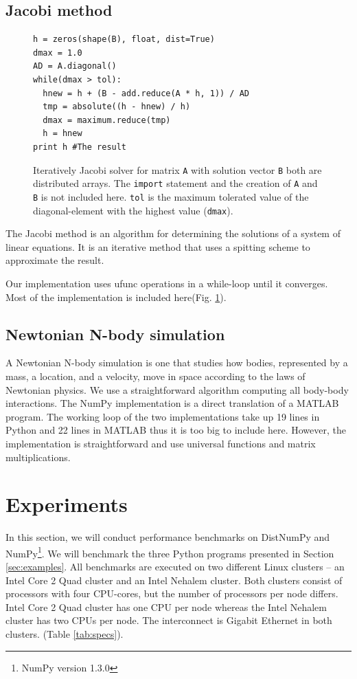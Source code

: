 \documentclass{sigplanconf}
\begin{document}
\subsection{Jacobi method}
\begin{figure}
\begin{lstlisting}
h = zeros(shape(B), float, dist=True)
dmax = 1.0
AD = A.diagonal()
while(dmax > tol):
  hnew = h + (B - add.reduce(A * h, 1)) / AD
  tmp = absolute((h - hnew) / h)
  dmax = maximum.reduce(tmp)
  h = hnew
print h #The result
\end{lstlisting}
 \caption{Iteratively Jacobi solver for matrix \texttt{A} with solution vector \texttt{B} both are distributed arrays. The \texttt{import} statement and the creation of \texttt{A} and \texttt{B} is not included here.
 \texttt{tol} is the maximum tolerated value of the diagonal-element with the highest value (\texttt{dmax}).}
 \label{lst:jocobi}
\end{figure}

The Jacobi method is an algorithm for determining the solutions of a system of linear equations. It is an iterative method that uses a spitting scheme to approximate the result.

Our implementation uses ufunc operations in a while-loop until it converges. Most of the implementation is included here(Fig. \ref{lst:jocobi}).


\subsection{Newtonian N-body simulation}
A Newtonian N-body simulation is one that studies how bodies, represented by a mass, a location, and a velocity, move in space according to the laws of Newtonian physics. We use a straightforward algorithm computing all body-body interactions. The NumPy implementation is a direct translation of a MATLAB program\cite{assignmentNbody}. The working loop of the two implementations take up 19 lines in Python and 22 lines in MATLAB thus it is too big to include here. However, the implementation is straightforward and use universal functions and matrix multiplications.


\section{Experiments}
In this section, we will conduct performance benchmarks on DistNumPy and NumPy\footnote{NumPy version 1.3.0}. We will benchmark the three Python programs presented in Section \ref{sec:examples}. All benchmarks are executed on two different Linux clusters -- an Intel Core 2 Quad cluster and an Intel Nehalem cluster. Both clusters consist of processors with four CPU-cores, but the number of processors per node differs. Intel Core 2 Quad cluster has one CPU per node whereas the Intel Nehalem cluster has two CPUs per node. The interconnect is Gigabit Ethernet in both clusters. (Table \ref{tab:specs}).
\end{document}
